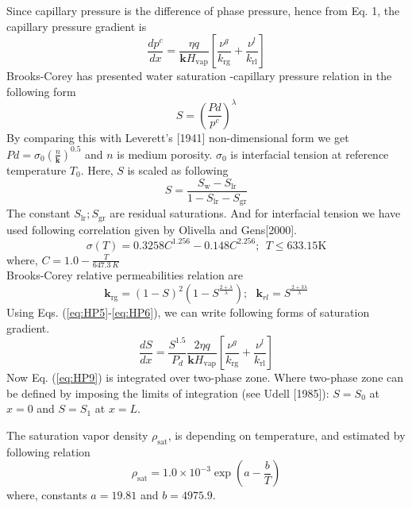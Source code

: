 Since capillary pressure is the difference of phase pressure, hence from Eq. 1, the capillary pressure gradient is
\begin{equation}
\frac{d p^c}{d x} = \frac{\eta q}{\mathbf k H_{\mathrm {vap}}}\left[\frac{\nu^g}{k_{\mathrm {rg}}} + \frac{\nu^l}{k_{\mathrm {rl}}}\right]
\label{eq:HP5}
\end{equation}
Brooks-Corey has presented water saturation -capillary pressure relation in the following form
\begin{equation}
S=\left(\frac{Pd}{p^c}\right)^\lambda
\label{eq:HP6}
\end{equation}
By comparing this with Leverett's [1941] non-dimensional form we get $Pd=\sigma_0\left(\frac{n}{\mathbf k}\right)^{0.5}$ and $n$ is medium porosity. $\sigma_0$ is interfacial tension at reference temperature $T_0$. Here, $S$ is scaled as following 
\begin{equation}
S=\frac{S_{\mathrm {w}}-S_{\mathrm {lr}}}{1-S_{\mathrm {lr}}-S_{\mathrm {gr}}}
\label{eq:HP7}
\end{equation}
The constant $S_{\mathrm {lr}}; S_{\mathrm {gr}}$ are residual saturations. And for interfacial tension we have used following correlation given by Olivella and Gens[2000].
\begin{equation}
\sigma( T)={0.3258C^{1.256}} - {0.148C^{2.256}};~~ T\le 633.15 \mathrm K
\label{eq:surface_tension}
\end{equation}
where, $C=1.0-\frac{T}{647.3~K}$\\

Brooks-Corey relative permeabilities relation are 
\begin{equation}
\mathbf k_{\mathrm {rg}}=\left(1-S\right)^2 \left(1-S^{\frac{2+\lambda}{\lambda}}\right);~~~\mathbf k_{rl}=S^{\frac{2+3\lambda}{\lambda}}
\label{eq:HP8}
\end{equation}
Using Eqs. (\ref{eq:HP5}-\ref{eq:HP6}), we can write following forms of saturation gradient.
\begin{equation}
\frac{d S}{d x}=\frac{S^{1.5}}{P_d}\frac{2\eta q}{\mathbf k H_{\mathrm {vap}}}\left[\frac{\nu^g}{k_{\mathrm {rg}}} + \frac{\nu^l}{k_{\mathrm {rl}}}\right]
\label{eq:HP9}
\end{equation}
Now Eq. (\ref{eq:HP9}) is integrated over two-phase zone. Where two-phase zone can be defined by imposing the limits of integration (see Udell [1985]): $S=S_0$ at $x=0$ and $S=S_1$ at $x=L$.

The saturation vapor density $\rho_{\mathrm {sat}}$, is depending on temperature, and estimated by following relation
\begin{equation}
\rho_{\mathrm {sat}}=1.0\times10^{-3}\exp\left(a-\frac{b}{T}\right)
\label{eq:HP10}
\end{equation}
where, constants $a=19.81$ and $b=4975.9$.

